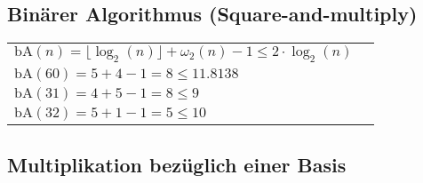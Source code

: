 \documentclass[
	final,
	a4paper,
	oneside,
	parskip=full,
	headings=standardclasses,
	headings=big,
	pointednumbers,
    fleqn
]{scrartcl}
\newcommand{\kl}[1]{{\left( #1 \right)}}
\begin{document}
    \subsection*{Binärer Algorithmus (Square-and-multiply)}
    
    \begin{tabular}{ll}
        $\text{bA}\kl{n} = \lfloor \log_2\kl{n} \rfloor + \omega_2\kl{n} - 1 \leqslant 2 \cdot \log_2\kl{n}$ \\
        $\text{bA}\kl{60} = 5 + 4 - 1 = 8 \leqslant 11.8138 $ \\
        $\text{bA}\kl{31} = 4 + 5 - 1 = 8 \leqslant 9 $ \\
        $\text{bA}\kl{32} = 5 + 1 - 1 = 5 \leqslant 10 $
    \end{tabular}

    \newpage

    \subsection*{Multiplikation bezüglich einer Basis}
\end{document}
